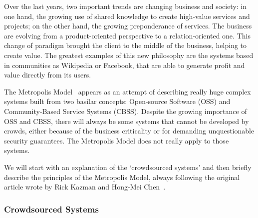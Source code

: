 Over the last years, two important trends are changing business and society: in one hand, the growing use of shared knowledge to create high-value services and projects; on the other hand, the growing preponderance of services. The business are evolving from a product-oriented perspective to a relation-oriented one. This change of paradigm brought the client to the middle of the business, helping to create value. The greatest examples of this new philosophy are the systems based in communities as Wikipedia or Facebook, that are able to generate profit and value directly from its users.

The Metropolis Model~\citep{Kazman2009} appears as an attempt of describing really huge complex systems built from two basilar concepts: Open-source Software (OSS) and Community-Based Service Systems (CBSS). Despite the growing importance of OSS and CBSS, there will always be some systems that cannot be developed by crowds, either because of the business criticality or for demanding unquestionable security guarantees. The Metropolis Model does not really apply to those systems.

We will start with an explanation of the `crowdsourced systems' and then briefly describe the principles of the Metropolis Model, always following the original article wrote by Rick Kazman and Hong-Mei Chen~\citep{Kazman2009}.

\subsubsection{Crowdsourced Systems}

